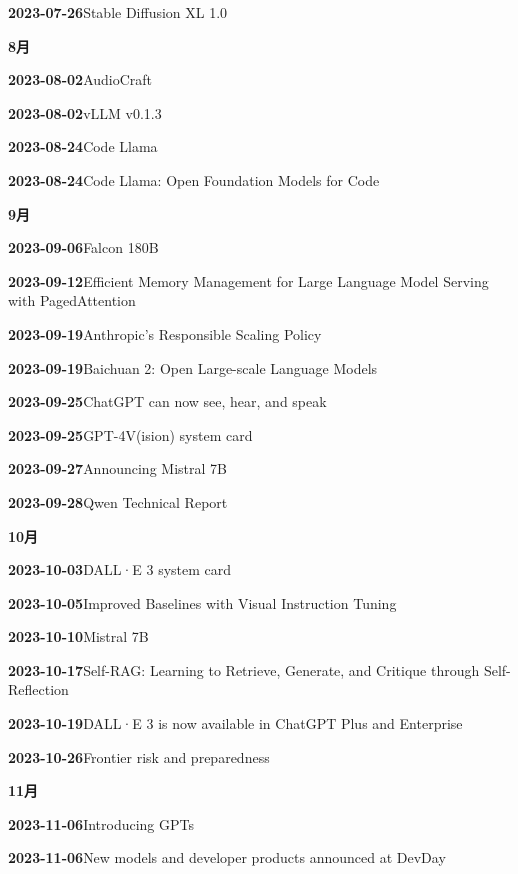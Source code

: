 \noindent\textbf{2023-07-26}\quad Stable Diffusion XL 1.0\par
\medskip
\noindent\textbf{8月}\par
\smallskip
\noindent\textbf{2023-08-02}\quad AudioCraft\par
\noindent\textbf{2023-08-02}\quad vLLM v0.1.3\par
\noindent\textbf{2023-08-24}\quad Code Llama\par
\noindent\textbf{2023-08-24}\quad Code Llama: Open Foundation Models for Code\par
\medskip
\noindent\textbf{9月}\par
\smallskip
\noindent\textbf{2023-09-06}\quad Falcon 180B\par
\noindent\textbf{2023-09-12}\quad Efficient Memory Management for Large Language Model Serving with PagedAttention\par
\noindent\textbf{2023-09-19}\quad Anthropic's Responsible Scaling Policy\par
\noindent\textbf{2023-09-19}\quad Baichuan 2: Open Large-scale Language Models\par
\noindent\textbf{2023-09-25}\quad ChatGPT can now see, hear, and speak\par
\noindent\textbf{2023-09-25}\quad GPT-4V(ision) system card\par
\noindent\textbf{2023-09-27}\quad Announcing Mistral 7B\par
\noindent\textbf{2023-09-28}\quad Qwen Technical Report\par
\medskip
\noindent\textbf{10月}\par
\smallskip
\noindent\textbf{2023-10-03}\quad DALL·E 3 system card\par
\noindent\textbf{2023-10-05}\quad Improved Baselines with Visual Instruction Tuning\par
\noindent\textbf{2023-10-10}\quad Mistral 7B\par
\noindent\textbf{2023-10-17}\quad Self-RAG: Learning to Retrieve, Generate, and Critique through Self-Reflection\par
\noindent\textbf{2023-10-19}\quad DALL·E 3 is now available in ChatGPT Plus and Enterprise\par
\noindent\textbf{2023-10-26}\quad Frontier risk and preparedness\par
\medskip
\noindent\textbf{11月}\par
\smallskip
\noindent\textbf{2023-11-06}\quad Introducing GPTs\par
\noindent\textbf{2023-11-06}\quad New models and developer products announced at DevDay\par
